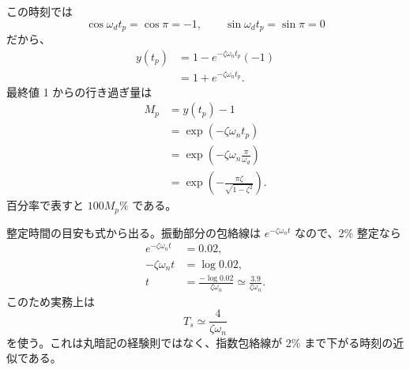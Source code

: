 \begin{derivation}
この時刻では
\begin{equation}
  \cos\omega_d t_p=\cos\pi=-1,
  \qquad
  \sin\omega_d t_p=\sin\pi=0
\end{equation}
だから、
\begin{align}
  y(t_p)
  &=1-e^{-\zeta\omega_n t_p}(-1)\\
  &=1+e^{-\zeta\omega_n t_p}.
\end{align}
最終値 1 からの行き過ぎ量は
\begin{align}
  M_p&=y(t_p)-1\\
  &=\exp(-\zeta\omega_n t_p)\\
  &=\exp\left(-\zeta\omega_n\frac{\pi}{\omega_d}\right)\\
  &=\exp\left(-\frac{\pi\zeta}{\sqrt{1-\zeta^2}}\right).
\end{align}
百分率で表すと $100M_p\%$ である。
\end{derivation}

整定時間の目安も式から出る。振動部分の包絡線は $e^{-\zeta\omega_n t}$ なので、2\% 整定なら
\begin{align}
  e^{-\zeta\omega_n t}&=0.02,\\
  -\zeta\omega_n t&=\log 0.02,\\
  t&=\frac{-\log 0.02}{\zeta\omega_n}\simeq
  \frac{3.9}{\zeta\omega_n}.
\end{align}
このため実務上は
\begin{equation}
  T_s\simeq\frac{4}{\zeta\omega_n}
\end{equation}
を使う。これは丸暗記の経験則ではなく、指数包絡線が 2\% まで下がる時刻の近似である。
